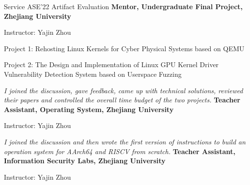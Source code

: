 \begin{rubric}{Service}
\entry*[2022] 
    ASE'22 Artifact Evaluation 
\entry*[2020.09 -- 2021.06] 
    \textbf{Mentor, Undergraduate Final Project, Zhejiang University}
    \par Instructor: Yajin Zhou
    \par {Project 1: Rehosting Linux Kernels for Cyber Physical Systems based on QEMU}
    \par {Project 2: The Design and Implementation of Linux GPU Kernel Driver Vulnerability Detection System based on Userspace Fuzzing}
    \par \emph{I joined the discussion,  gave feedback, came up with technical solutions,
    reviewed their papers and controlled the overall time budget of the two projects.}
\entry*[2019.09 -- 2020.01] 
    \textbf{Teacher Assistant, Operating System, Zhejiang University}
    \par Instructor: Yajin Zhou
    \par \emph{I joined the discussion and then wrote the first version 
    of instructions to build an operation system for AArch64 and RISCV from scratch.}
\entry*[2019.03 -- 2019.06] 
    \textbf{Teacher Assistant, Information Security Labs, Zhejiang University}
    \par Instructor: Yajin Zhou
\end{rubric}